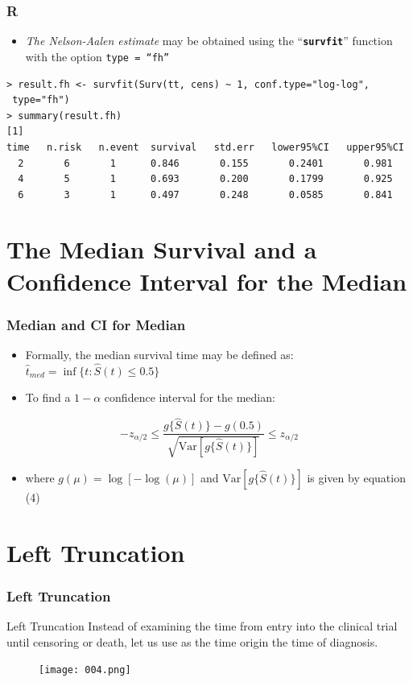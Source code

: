 \documentclass{beamer}
\newcommand{\empr}[1]{{\emph{\color{red}#1}}}
\newcommand{\pkg}[1]{{\textbf{\texttt{#1}}}}
\newcommand{\Var}{\mathrm{Var}}%
\begin{document}
\pagebreak
\begin{frame}[fragile]
\frametitle{R}
\begin{itemize}
\item \empr{The Nelson-Aalen estimate} may be obtained using the ``\pkg{survfit}'' function with the option \texttt{type = ``fh''}
\end{itemize}
\begin{Verbatim}
> result.fh <- survfit(Surv(tt, cens) ~ 1, conf.type="log-log",
 type="fh")
> summary(result.fh)
[1]
time   n.risk   n.event  survival   std.err   lower95%CI   upper95%CI
  2       6       1      0.846       0.155       0.2401       0.981
  4       5       1      0.693       0.200       0.1799       0.925
  6       3       1      0.497       0.248       0.0585       0.841
\end{Verbatim}
\end{frame}

\section{The Median Survival and a Confidence Interval for the Median}
\begin{frame}
\frametitle{Median and CI for Median}
\begin{itemize}
\item Formally, the median survival time may be defined as:
 ${\hat{t}}_{med} = \inf \lbrace t : \hat{S}(t)\le 0.5\rbrace $
\end{itemize}
\begin{itemize}
\item To find a $1-\alpha$ confidence interval for the median:
\end{itemize}
\begin{equation}
-z_{\alpha/2} \le \frac{g\lbrace\hat{S}(t)\rbrace-g(0.5)}{\sqrt{\Var[g\lbrace\hat{S}(t)\rbrace]}}\le z_{\alpha/2}
\end{equation}

\begin{itemize}
\item where $g(\mu)=\log[-\log(\mu)]$ and $\Var[g\lbrace\hat{S}(t)\rbrace]$ is given by equation (4)
\end{itemize}
\end{frame}

\section{Left Truncation}
\begin{frame}
\frametitle{Left Truncation}

\begin{defblock}{Left Truncation}
Instead of examining the time from {\color{red}entry} into the clinical trial until {\color{red}censoring or death}, let us use as the time origin the time of {\color{red}diagnosis}.
\end{defblock}

\begin{figure}[h!]
	\texttt{[image: 004.png]}
\end{figure}
\end{frame}
\end{document}
